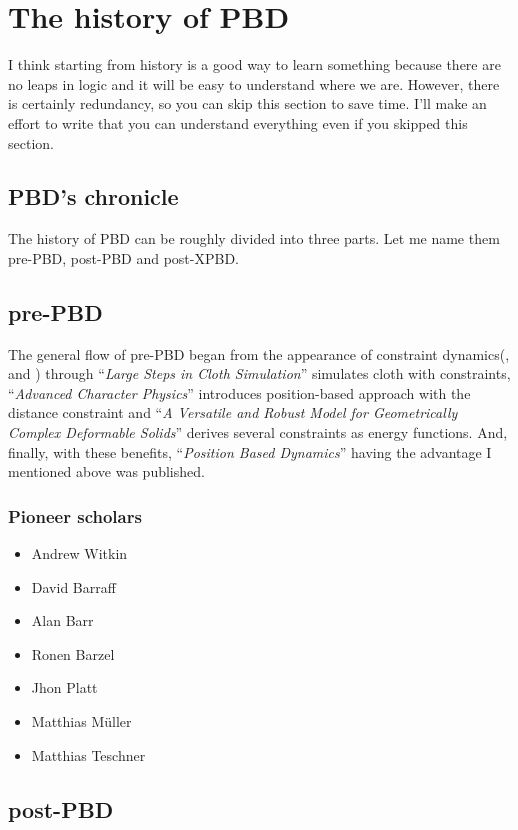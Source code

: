 \documentclass[pdflatex,sn-mathphys-num]{sn-jnl}%
\theoremstyle{thmstyleone}%
\theoremstyle{thmstyletwo}%
\theoremstyle{thmstylethree}%
\newcommand{\pname}[1]{``{\sl #1}''}
\begin{document}
\section{The history of PBD}
I think starting from history is a good way to learn something because there are no leaps in logic and it will be easy to understand where we are. However, there is certainly redundancy, so you can skip this section to save time. I'll make an effort to write that you can understand everything even if you skipped this section.
\subsection{PBD's chronicle}
The history of PBD can be roughly divided into three parts.
Let me name them pre-PBD, post-PBD and post-XPBD.

\subsection{pre-PBD}
The general flow of pre-PBD began from the appearance of constraint dynamics(\cite{EnergyWitkin1987}, \cite{ConstrainedBarzel} and \cite{ConstrainedPlatt}) through \pname{Large Steps in Cloth Simulation}\cite{LargeStepBaraff} simulates cloth with constraints, \pname{Advanced Character Physics}\cite{Jakobsen2003AdvancedCP} introduces position-based approach with the distance constraint and \pname{A Versatile and Robust Model for Geometrically Complex Deformable Solids}\cite{VersatileTeschner} derives several constraints as energy functions.
And, finally, with these benefits, \pname{Position Based Dynamics}\cite{PBD} having the advantage I mentioned above was published.

\subsubsection{Pioneer scholars}

	\begin{itemize}
	\item Andrew Witkin
	\item David Barraff
	\item Alan Barr
	\item Ronen Barzel
	\item Jhon Platt
	\item Matthias Müller
	\item Matthias Teschner
\end{itemize}

\subsection{post-PBD}
\end{document}
